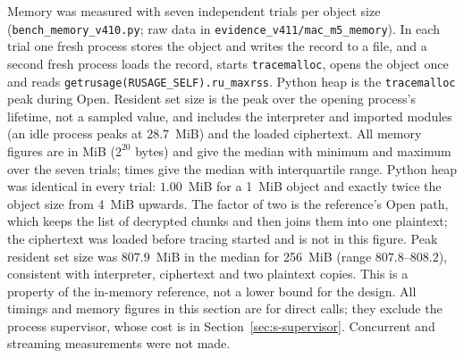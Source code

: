 \documentclass[pdflatex,sn-mathphys-num]{sn-jnl}
\newcommand{\code}[1]{\texttt{#1}}
\newcommand{\fpath}[1]{\nolinkurl{#1}}%
\begin{document}
Memory was measured with seven independent trials per object size (\fpath{bench_memory_v410.py}; raw data in \fpath{evidence_v411/mac_m5_memory}). In each trial one fresh process stores the object and writes the record to a file, and a second fresh process loads the record, starts \code{tracemalloc}, opens the object once and reads \code{getrusage(RUSAGE\_SELF).ru\_maxrss}. Python heap is the \code{tracemalloc} peak during Open. Resident set size is the peak over the opening process's lifetime, not a sampled value, and includes the interpreter and imported modules (an idle process peaks at $28.7$~MiB) and the loaded ciphertext. All memory figures are in MiB ($2^{20}$ bytes) and give the median with minimum and maximum over the seven trials; times give the median with interquartile range. Python heap was identical in every trial: $1.00$~MiB for a 1~MiB object and exactly twice the object size from 4~MiB upwards. The factor of two is the reference's Open path, which keeps the list of decrypted chunks and then joins them into one plaintext; the ciphertext was loaded before tracing started and is not in this figure. Peak resident set size was $807.9$~MiB in the median for 256~MiB (range $807.8$--$808.2$), consistent with interpreter, ciphertext and two plaintext copies. This is a property of the in-memory reference, not a lower bound for the design. All timings and memory figures in this section are for direct calls; they exclude the process supervisor, whose cost is in Section~\ref{sec:s-supervisor}. Concurrent and streaming measurements were not made.
\end{document}
